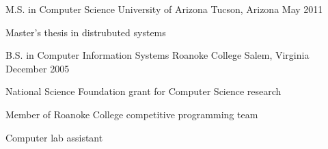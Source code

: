 

\begin{cventries}

  \cventry
    {M.S. in Computer Science} %
    {University of Arizona} %
    {Tucson, Arizona} %
    {May 2011} %
    {
        \begin{cvitems}
          \item {Master's thesis in distrubuted systems}
        \end{cvitems}
    }

  \cventry
    {B.S. in Computer Information Systems} %
    {Roanoke College} %
    {Salem, Virginia} %
    {December 2005} %
    {
        \begin{cvitems}
          \item {National Science Foundation grant for Computer Science research}
          \item {Member of Roanoke College competitive programming team}
          \item {Computer lab assistant}
        \end{cvitems}
    }


\end{cventries}
